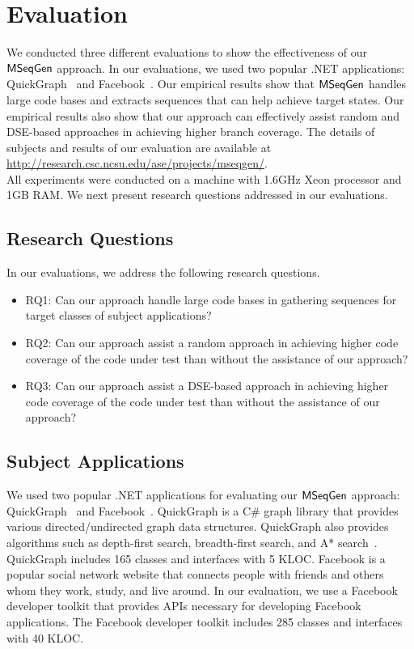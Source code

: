 \section{Evaluation}
\label{sec:eval}

We conducted three different evaluations to show the effectiveness of our $\textsf{MSeqGen} $ approach. In our evaluations, we used two popular .NET applications: QuickGraph~\cite{QUICKGRAPH} and Facebook~\cite{FACEBOOK}. Our empirical results show that $\textsf{MSeqGen} $ handles large code bases and extracts sequences that can help achieve target states. Our empirical results also show that our approach can effectively assist random and DSE-based approaches in achieving higher branch coverage. The details of subjects and results of our evaluation are available at \url{http://research.csc.ncsu.edu/ase/projects/mseqgen/}. \\ All experiments were conducted on a machine with 1.6GHz Xeon processor and 1GB RAM. We next present research questions addressed in our evaluations.

\subsection{Research Questions}

In our evaluations, we address the following research questions.\vspace*{-1ex}

\begin{itemize}
\item RQ1: Can our approach handle large code bases in gathering sequences for target classes of subject applications?
\item RQ2: Can our approach assist a random approach in achieving higher code coverage of the code under test than without the assistance of our approach?
\item RQ3: Can our approach assist a DSE-based approach in achieving higher code coverage of the code under test than without the assistance of our approach?
\end{itemize}

\subsection{Subject Applications}

We used two popular .NET applications for evaluating our $\textsf{MSeqGen} $ approach: QuickGraph~\cite{QUICKGRAPH} and Facebook~\cite{FACEBOOK}. QuickGraph is a C\# graph library that provides various directed/undirected graph data structures. QuickGraph also provides algorithms such as depth-first search, breadth-first search, and A* search~\cite{thomas:algos}. 
QuickGraph includes 165 classes and interfaces with 5 KLOC. Facebook is a popular social network website that connects people with friends and others whom they work, study, and live around. In our evaluation, we use a Facebook developer toolkit that provides APIs necessary for developing Facebook applications. The Facebook developer toolkit includes 285 classes and interfaces with 40 KLOC.

